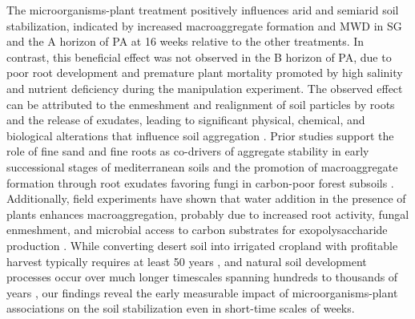 The microorganisms-plant treatment positively influences arid and semiarid soil stabilization, indicated by increased macroaggregate formation and MWD in SG and the A horizon of PA at 16 weeks relative to the other treatments. In contrast, this beneficial effect was not observed in the B horizon of PA, due to poor root development and premature plant mortality promoted by high salinity and nutrient deficiency during the manipulation experiment. The observed effect can be attributed to the enmeshment and realignment of soil particles by roots and the release of exudates, leading to significant physical, chemical, and biological alterations that influence soil aggregation \citep{Bronick2005}. Prior studies support the role of fine sand and fine roots as co-drivers of aggregate stability in early successional stages of mediterranean soils \citep{Erktan2016} and the promotion of macroaggregate formation through root exudates favoring fungi in carbon-poor forest subsoils \citep{Baumert2018}. Additionally, field experiments have shown that water addition in the presence of plants enhances macroaggregation, probably due to increased root activity, fungal enmeshment, and microbial access to carbon substrates for exopolysaccharide production \citep{Blankinship2016}. While converting desert soil into irrigated cropland with profitable harvest typically requires at least 50 years \citep{Su2010}, and natural soil development processes occur over much longer timescales spanning hundreds to thousands of years \citep{Jenny1994}, our findings reveal the early measurable impact of microorganisms-plant associations on the soil stabilization even in short-time scales of weeks.

